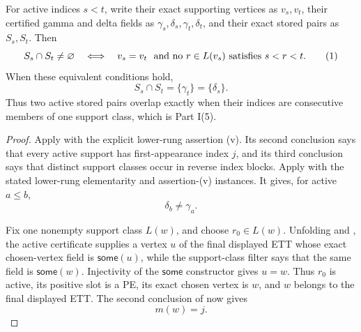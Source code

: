 \begin{lemma}
For active indices \(s<t\), write their exact supporting vertices as
\(v_s,v_t\), their certified gamma and delta fields as
\(\gamma_s,\delta_s,\gamma_t,\delta_t\), and their exact stored pairs as
\(S_s,S_t\).  Then
\[
 S_s\cap S_t\ne\varnothing
 \quad\Longleftrightarrow\quad
 v_s=v_t\ \hbox{ and no }r\in L(v_s)\hbox{ satisfies }s<r<t.    \tag{1}
\]
When these equivalent conditions hold,
\[
                  S_s\cap S_t=\{\gamma_t\}=\{\delta_s\}.       \tag{2}
\]
Thus two active stored pairs overlap exactly when their indices are
consecutive members of one support class, which is Part I(5).
\end{lemma}
\begin{proof}
Apply  with the explicit lower-rung
assertion (v).  Its second conclusion says that every active support has
first-appearance index \(j\), and its third conclusion says that distinct
support classes occur in reverse index blocks.  Apply
 with the stated lower-rung
elementarity and assertion-(v) instances.  It gives, for active
\(a\leq b\),
\[
                         \delta_b\ne\gamma_a.                  \tag{3}
\]

Fix one nonempty support class \(L(w)\), and choose
\(r_0\in L(w)\).  Unfolding
 and
, the active certificate supplies a
vertex \(u\) of the final displayed ETT whose exact chosen-vertex field is
\(\mathsf{some}(u)\), while the support-class filter says that the same
field is \(\mathsf{some}(w)\).  Injectivity of the
\(\mathsf{some}\) constructor gives \(u=w\).
Thus \(r_0\) is active, its positive slot is a PE, its exact chosen vertex
is \(w\), and \(w\) belongs to the final displayed ETT.  The second
conclusion of  now gives
\[
                              m(w)=j.                          \tag{4}
\]


\end{proof}
